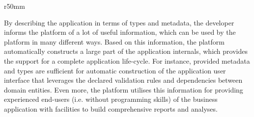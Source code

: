   \begin{wrapfigure}{r}{50mm}
    \vspace{-20pt}
    \centering   
    \vspace{-10pt}
  \end{wrapfigure}

  By describing the application in terms of types and metadata, the developer informs the platform of a lot of useful information, which can be used by the platform in many different ways.
  Based on this information, the platform automatically constructs a large part of the application internals, which provides the support for a complete application life-cycle.
  For instance, provided metadata and types are sufficient for automatic construction of the application user interface that leverages the declared validation rules and dependencies between domain entities.
  Even more, the platform utilises this information for providing experienced end-users (i.e. without programming skills) of the business application with facilities to build comprehensive reports and analyses.
  
